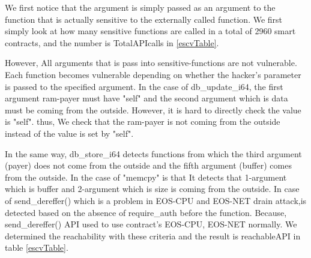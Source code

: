 
We first notice that the argument is simply passed as an argument to the function that is actually sensitive to the externally called function. We first simply look at how many sensitive functions are called in a total of 2960 smart contracts, and the number is TotalAPIcalls in  \autoref{escvTable}.

However, All arguments that is pass into sensitive-functions are not vulnerable. Each function becomes vulnerable depending on whether the hacker's parameter is passed to the specified argument. In the case of db\_update\_i64, the first argument ram-payer must have "self" and the second argument which is data must be coming from the outside. However, it is hard to directly check the value is "self". thus, We check that the ram-payer is not coming from the outside instead of the value is set by "self".



In the same way, db\_store\_i64 detects functions from which the third argument (payer) does not come from the outside and the fifth argument (buffer) comes from the outside.
In the case of "memcpy" is that It detects that 1-argument which is buffer and 2-argument which is size is coming from the outside.
In case of send\_dereffer() which is a problem in EOS-CPU and EOS-NET drain attack,is detected based on the absence of require\_auth before the function. Because, send\_dereffer() API used to use contract's EOS-CPU, EOS-NET normally.
We determined the reachability with these criteria and the result is reachableAPI in table \autoref{escvTable}.


